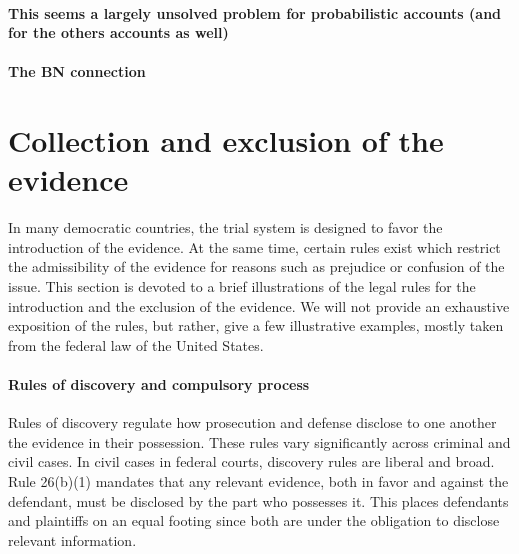 \documentclass[10pt]{article}
\begin{document}
\paragraph{This seems a largely unsolved problem for probabilistic accounts (and for the others accounts as well)}

\paragraph{The BN connection}


\section{Collection and exclusion of the evidence}

In many democratic countries, the trial system is designed to favor the introduction 
of the evidence. At the same time,  certain rules exist which restrict the admissibility of the evidence for reasons such as prejudice or confusion of the issue. 
This section is devoted to a brief illustrations of the legal rules for the introduction and the exclusion of the evidence. We will not provide an exhaustive 
exposition of the rules, but rather, give a few illustrative examples, mostly taken from the federal law of the United States. 

\paragraph{Rules of discovery and compulsory process}

Rules of discovery regulate how prosecution and defense disclose to one another the evidence in their possession.
These rules vary significantly across criminal and civil cases. 
In civil cases in federal courts, discovery rules are liberal and broad. 
Rule 26(b)(1) mandates that any relevant evidence, both in favor and against the defendant, must 
be disclosed by the part who possesses it. This places defendants and plaintiffs on an equal 
footing since both are under the obligation to disclose relevant information.
\end{document}
